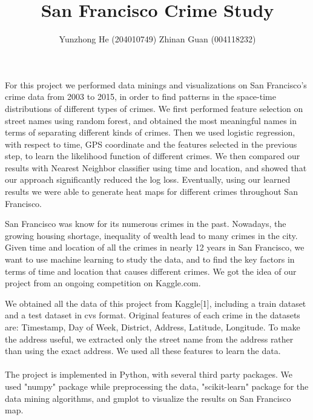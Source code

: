 \documentclass[12pt]{article}
\newenvironment{abs}[2][Part I Abstract]{\begin{trivlist}
\item[\hskip \labelsep {\bfseries #1}\hskip \labelsep {\bfseries #2}]}{\end{trivlist}}
\newenvironment{p1}[2][Part II Motivation]{\begin{trivlist}
\item[\hskip \labelsep {\bfseries #1}\hskip \labelsep {\bfseries #2}]}{\end{trivlist}}
\newenvironment{p2}[2][Part III Data and Software Tools]{\begin{trivlist}
\item[\hskip \labelsep {\bfseries #1}\hskip \labelsep {\bfseries #2}]}{\end{trivlist}}
\begin{document}
 
 
\title{San Francisco Crime Study}
\author{Yunzhong He (204010749) Zhinan Guan (004118232)}
\maketitle

\begin{abs}{}
\item{}
For this project we performed data minings and visualizations on San Francisco's crime data from 2003 to 2015, in order to find patterns in the space-time distributions of different types of crimes. We first performed feature selection on street names using random forest, and obtained the most meaningful names in terms of separating different kinds of crimes. Then we used logistic regression, with respect to time, GPS coordinate and the features selected in the previous step, to learn the likelihood function of different crimes. We then compared our results with Nearest Neighbor classifier using time and location, and showed that our approach significantly reduced the log loss. Eventually, using our learned results we were able to generate heat maps for different crimes throughout San Francisco.
\end{abs}

\begin{p1}{}
\item{}
San Francisco was know for its numerous crimes in the past. Nowadays, the growing housing shortage,  inequality of wealth lead to many crimes in the city. Given time and location of all the crimes in nearly 12 years in San Francisco, we want to use machine learning to study the data, and to find the key factors in terms of time and location that causes different crimes. We got the idea of our project from an ongoing competition on Kaggle.com. 
\end{p1}

\begin{p2}{}
\item{}
We obtained all the data of this project from Kaggle[1], including a train dataset and a test dataset in cvs format. Original features of each crime in the datasets are: Timestamp, Day of Week, District, Address, Latitude, Longitude. To make the address useful, we extracted only the street name from the address rather than using the exact address. We used all these features to learn the data.\\\\
The project is implemented in Python, with several third party packages. We used "numpy" package while preprocessing the data, "scikit-learn" package for the data mining algorithms, and gmplot to visualize the results on San Francisco map. 
\end{p2}
\end{document}
